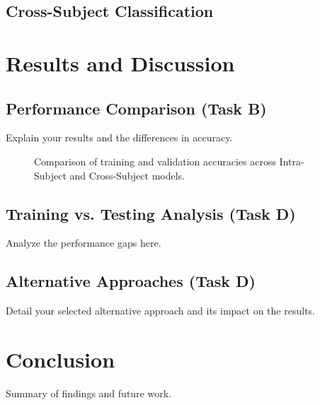 \documentclass[conference]{IEEEtran}
\begin{document}
\subsection{Cross-Subject Classification}

\section{Results and Discussion}

\subsection{Performance Comparison (Task B)}
Explain your results and the differences in accuracy.

\begin{figure} [h]
    \centering
    \caption{Comparison of training and validation accuracies across Intra-Subject and Cross-Subject models.}
    \label{fig:results_label}
\end{figure}

\subsection{Training vs. Testing Analysis (Task D)}
Analyze the performance gaps here.

\subsection{Alternative Approaches (Task D)}
Detail your selected alternative approach and its impact on the results.

\section{Conclusion}
Summary of findings and future work.

\nocite{*}


\end{document}
